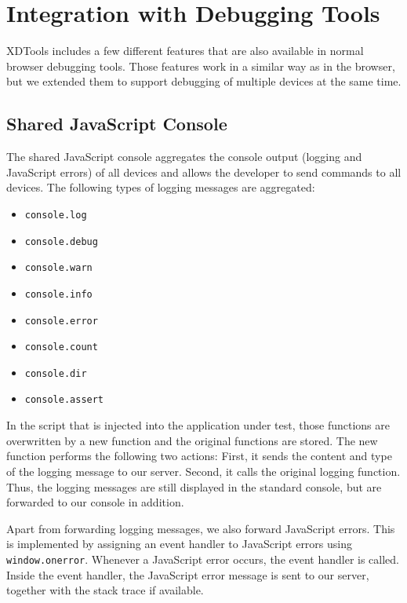 \section{Integration with Debugging Tools}

XDTools includes a few different features that are also available in normal browser debugging tools. Those features work in a similar way as in the browser, but we extended them to support debugging of multiple devices at the same time.

\subsection{Shared JavaScript Console}

The shared JavaScript console aggregates the console output (logging and JavaScript errors) of all devices and allows the developer to send commands to all devices. The following types of logging messages are aggregated:
\begin{itemize}
	\item \lstinline|console.log|
	\item \lstinline|console.debug|
	\item \lstinline|console.warn|
	\item \lstinline|console.info|
	\item \lstinline|console.error|
	\item \lstinline|console.count|
	\item \lstinline|console.dir|
	\item \lstinline|console.assert|
\end{itemize}
In the script that is injected into the application under test, those functions are overwritten by a new function and the original functions are stored. The new function performs the following two actions: First, it sends the content and type of the logging message to our server. Second, it calls the original logging function. Thus, the logging messages are still displayed in the standard console, but are forwarded to our console in addition.

Apart from forwarding logging messages, we also forward JavaScript errors. This is implemented by assigning an event handler to JavaScript errors using \lstinline|window.onerror|. Whenever a JavaScript error occurs, the event handler is called. Inside the event handler, the JavaScript error message is sent to our server, together with the stack trace if available. 

